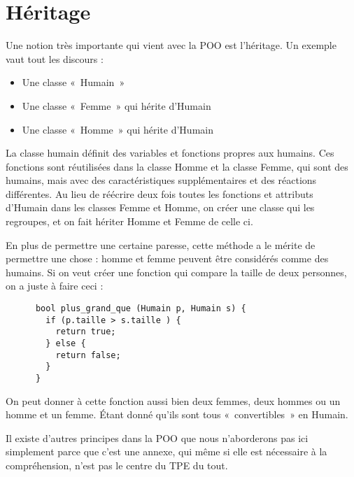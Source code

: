   \section{Héritage}
    Une notion très importante qui vient avec la POO est l'héritage. Un exemple vaut tout les discours :
      \begin{itemize}
        \item Une classe «~Humain~»
        \item Une classe «~Femme~» qui hérite d'Humain
        \item Une classe «~Homme~» qui hérite d'Humain
      \end{itemize}
    
    La classe humain définit des variables et fonctions propres aux humains. Ces fonctions sont réutilisées dans la classe Homme et la classe Femme, qui sont des humains, mais avec des caractéristiques supplémentaires et des réactions différentes. Au lieu de réécrire deux fois toutes les fonctions et attributs d'Humain dans les classes Femme et Homme, on créer une classe qui les regroupes, et on fait hériter Homme et Femme de celle ci.
    
    En plus de permettre une certaine paresse, cette méthode a le mérite de permettre une chose : homme et femme peuvent être considérés comme des humains. Si on veut créer une fonction qui compare la taille de deux 
    personnes, on a juste à faire ceci :
    \begin{lstlisting}
      bool plus_grand_que (Humain p, Humain s) {
        if (p.taille > s.taille ) {
          return true;
        } else {
          return false;
        }
      }
    \end{lstlisting}
    
    On peut donner à cette fonction aussi bien deux femmes, deux hommes ou un homme et un femme. Étant donné qu'ils sont tous «~convertibles~» en Humain.
    
    Il existe d'autres principes dans la POO que nous n'aborderons pas ici simplement parce que c'est une annexe, qui même si elle est nécessaire à la compréhension, n'est pas le centre du TPE du tout.
